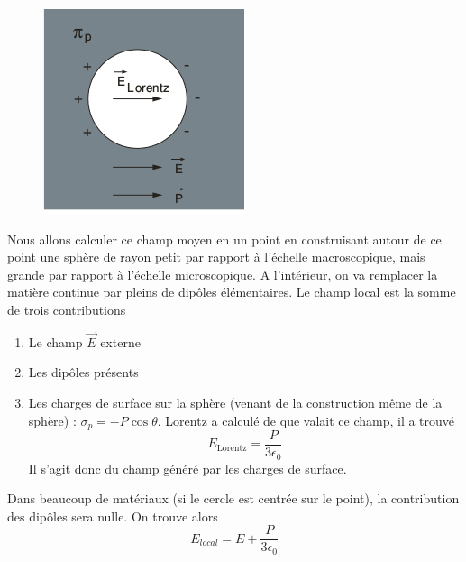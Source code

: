 	\begin{figure}
	\includegraphics[scale=0.25]{ch3/image2.png}
	\end{figure}
Nous allons calculer ce champ moyen en un point en construisant autour de ce point une sphère de rayon 
petit par rapport à l'échelle macroscopique, mais grande par rapport à l'échelle microscopique. A l'intérieur,
on va remplacer la matière continue par pleins de dipôles élémentaires. Le champ local est la somme de trois
contributions
\begin{enumerate}
\item Le champ $\vec{E}$ externe
\item Les dipôles présents
\item Les charges de surface sur la sphère (venant de la construction même de la sphère) : $\sigma_p = -
P\cos\theta$. Lorentz a calculé de que valait ce champ, il a trouvé
\begin{equation}
E_{\text{Lorentz}} = \dfrac{P}{3\epsilon_0}
\end{equation}
Il s'agit donc du champ généré par les charges de surface.
\end{enumerate}
Dans beaucoup de matériaux (si le cercle est centrée sur le point), la contribution des dipôles sera nulle. 
On trouve alors
\begin{equation}
E_{local} = E+\frac{P}{3\epsilon_0}
\end{equation}

